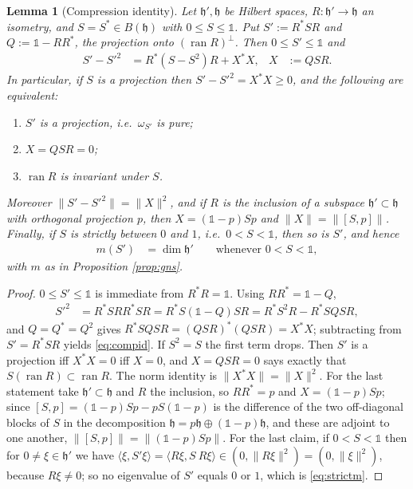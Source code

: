 \documentclass[11pt,a4paper]{article}
\newtheorem{lemma}[thm]{Lemma}
\theoremstyle{definition}
\newcommand{\fh}{\mathfrak{h}}
\newcommand{\1}{\mathds{1}}
\newcommand{\ran}{\operatorname{ran}}
\begin{document}
\begin{lemma}[Compression identity]
\label{lem:compression}
Let $\fh',\fh$ be Hilbert spaces, $R:\fh'\rightarrow\fh$ an isometry, and $S=S^{*}\in B(\fh)$ with
$0\leq S\leq\1$. Put $S':=R^{*}SR$ and $Q:=\1-RR^{*}$, the projection onto $(\ran R)^{\perp}$. Then
$0\leq S'\leq\1$ and
\begin{align}
\label{eq:compid}
S'-S'^{2} & = R^{*}(S-S^{2})R + X^{*}X, & X & := QSR.
\end{align}
In particular, if $S$ is a projection then $S'-S'^{2}=X^{*}X\geq0$, and the following are
equivalent:
\begin{enumerate}
\item[(i)] $S'$ is a projection, i.e.~$\omega_{S'}$ is pure;
\item[(ii)] $X=QSR=0$;
\item[(iii)] $\ran R$ is invariant under $S$.
\end{enumerate}
Moreover $\|S'-S'^{2}\|=\|X\|^{2}$, and if $R$ is the inclusion of a subspace $\fh'\subset\fh$ with
orthogonal projection $p$, then $X=(\1-p)Sp$ and $\|X\|=\|[S,p]\|$. Finally, if $S$ is \emph{strictly} between $0$ and $1$, i.e.~$0<S<\1$, then so is $S'$, and hence
\begin{align}
\label{eq:strictm}
m(S') & = \dim\fh' \qquad\text{whenever }0<S<\1,
\end{align}
with $m$ as in Proposition \ref{prop:gns}.
\end{lemma}

\begin{proof}
$0\leq S'\leq\1$ is immediate from $R^{*}R=\1$. Using $RR^{*}=\1-Q$,
\begin{align*}
S'^{2} & = R^{*}SRR^{*}SR = R^{*}S(\1-Q)SR = R^{*}S^{2}R - R^{*}SQSR,
\end{align*}
and $Q=Q^{*}=Q^{2}$ gives $R^{*}SQSR=(QSR)^{*}(QSR)=X^{*}X$; subtracting from $S'=R^{*}SR$ yields
\eqref{eq:compid}. If $S^{2}=S$ the first term drops. Then $S'$ is a projection iff $X^{*}X=0$ iff
$X=0$, and $X=QSR=0$ says exactly that $S(\ran R)\subset\ran R$. The norm identity is
$\|X^{*}X\|=\|X\|^{2}$. For the last statement take $\fh'\subset\fh$ and $R$ the inclusion, so
$RR^{*}=p$ and $X=(\1-p)Sp$; since $[S,p]=(\1-p)Sp-pS(\1-p)$ is the difference of the two
off-diagonal blocks of $S$ in the decomposition $\fh=p\fh\oplus(\1-p)\fh$, and these are adjoint to
one another, $\|[S,p]\|=\|(\1-p)Sp\|$. For the last claim, if $0<S<\1$ then for $0\neq\xi\in\fh'$ we have $\langle\xi,S'\xi\rangle=\langle R\xi,S\!\ R\xi\rangle\in(0,\|R\xi\|^{2})=(0,\|\xi\|^{2})$, because $R\xi\neq0$; so no eigenvalue of $S'$ equals $0$ or $1$, which is \eqref{eq:strictm}.
\end{proof}
\end{document}
